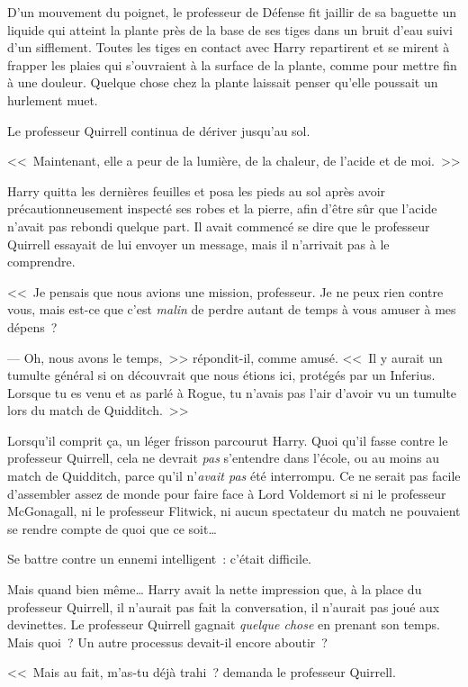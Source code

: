 D'un mouvement du poignet, le professeur de Défense fit jaillir de sa baguette un liquide qui atteint la plante près de la base de ses tiges dans un bruit d'eau suivi d'un sifflement. Toutes les tiges en contact avec Harry repartirent et se mirent à frapper les plaies qui s'ouvraient à la surface de la plante, comme pour mettre fin à une douleur. Quelque chose chez la plante laissait penser qu'elle poussait un hurlement muet.

Le professeur Quirrell continua de dériver jusqu'au sol.

<<~Maintenant, elle a peur de la lumière, de la chaleur, de l'acide et de moi.~>>

Harry quitta les dernières feuilles et posa les pieds au sol après avoir précautionneusement inspecté ses robes et la pierre, afin d'être sûr que l'acide n'avait pas rebondi quelque part. Il avait commencé se dire que le professeur Quirrell essayait de lui envoyer un message, mais il n'arrivait pas à le comprendre.

<<~Je pensais que nous avions une mission, professeur. Je ne peux rien contre vous, mais est-ce que c'est \emph{malin} de perdre autant de temps à vous amuser à mes dépens~?

--- Oh, nous avons le temps,~>> répondit-il, comme amusé. <<~Il y aurait un tumulte général si on découvrait que nous étions ici, protégés par un Inferius. Lorsque tu es venu et as parlé à Rogue, tu n'avais pas l'air d'avoir vu un tumulte lors du match de Quidditch.~>>

Lorsqu'il comprit ça, un léger frisson parcourut Harry. Quoi qu'il fasse contre le professeur Quirrell, cela ne devrait \emph{pas} s'entendre dans l'école, ou au moins au match de Quidditch, parce qu'il n'\emph{avait pas} été interrompu. Ce ne serait pas facile d'assembler assez de monde pour faire face à Lord Voldemort si ni le professeur McGonagall, ni le professeur Flitwick, ni aucun spectateur du match ne pouvaient se rendre compte de quoi que ce soit…

Se battre contre un ennemi intelligent~: c'était difficile.

Mais quand bien même… Harry avait la nette impression que, à la place du professeur Quirrell, il n'aurait pas fait la conversation, il n'aurait pas joué aux devinettes. Le professeur Quirrell gagnait \emph{quelque chose} en prenant son temps. Mais quoi~? Un autre processus devait-il encore aboutir~?

<<~Mais au fait, m'as-tu déjà trahi~? demanda le professeur Quirrell.

